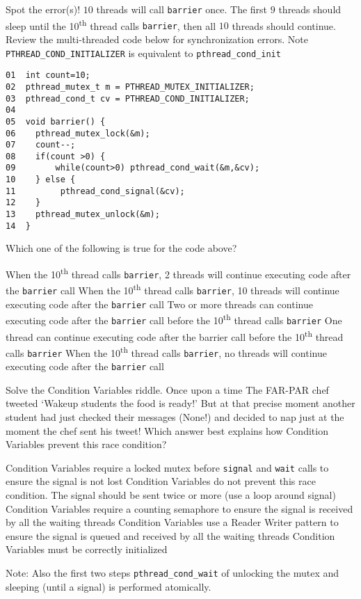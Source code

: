 \variant
Spot the error(s)! $10$ threads will call {\tt barrier} once. The first $9$ threads should sleep until the 10\textsuperscript{th}  thread calls {\tt barrier}, then all $10$ threads should continue.
Review the multi-threaded code below for synchronization errors. Note {\tt PTHREAD_COND_INITIALIZER} is equivalent to {\tt pthread_cond_init}
\begin{verbatim}
01  int count=10;
02  pthread_mutex_t m = PTHREAD_MUTEX_INITIALIZER;
03  pthread_cond_t cv = PTHREAD_COND_INITIALIZER; 
04
05  void barrier() { 
06    pthread_mutex_lock(&m);
07    count--;
08    if(count >0) {
09        while(count>0) pthread_cond_wait(&m,&cv);
10    } else {
11         pthread_cond_signal(&cv);
12    }
13    pthread_mutex_unlock(&m);
14  }
\end{verbatim}
Which one of the following is true for the code above?
\begin{answers}
\correctanswer When the 10\textsuperscript{th} thread calls {\tt barrier}, 2 threads will continue executing code after the {\tt barrier} call
\answer When the 10\textsuperscript{th} thread calls {\tt barrier}, 10 threads will continue executing code after the {\tt barrier} call
\answer Two or more threads can continue executing code after the {\tt barrier} call before the 10\textsuperscript{th} thread calls {\tt barrier} 
\answer One thread can continue executing code after the barrier call before the 10\textsuperscript{th} thread calls {\tt barrier} 
\answer When the 10\textsuperscript{th} thread calls {\tt barrier}, no threads will continue executing code after the {\tt barrier} call
\end{answers}
\begin{solution}
\end{solution}



\variant
Solve the Condition Variables riddle. Once upon a time The FAR-PAR chef tweeted `Wakeup students the food is ready!' But at that precise moment another student had just checked their messages (None!) and decided to nap just at the moment the chef sent his tweet! Which answer best explains how Condition Variables prevent this race condition?
\begin{answers}
\correctanswer Condition Variables require a locked mutex before {\tt signal} and {\tt wait} calls to ensure the signal is not lost
\answer Condition Variables do not prevent this race condition. The signal should be sent twice or more (use a loop around signal)
\answer Condition Variables require a counting semaphore to ensure the signal is received by all the waiting threads
\answer Condition Variables use a Reader Writer pattern to ensure the signal is queued and received by all the waiting threads
\answer Condition Variables must be correctly initialized
\end{answers}
\begin{solution}
Note: Also the first two steps {\tt pthread_cond_wait} of unlocking the mutex and sleeping (until a signal) is performed atomically.
\end{solution}


